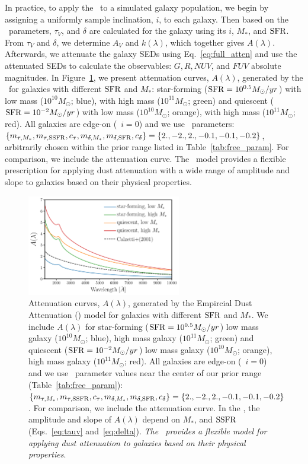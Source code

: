 In practice, to apply the \eda~to a simulated galaxy population, we begin by
assigning a uniformly sample inclination, $i$, to each galaxy. Then based on
the \eda~parameters, $\tau_V$, and $\delta$ are calculated for the galaxy using
its $i$, $M_*$, and ${\rm SFR}$. From $\tau_V$ and $\delta$, we determine $A_V$ and
$k(\lambda)$, which together gives $A(\lambda)$.  Afterwards, we attenuate the
galaxy SEDs using Eq.~\ref{eq:full_atten} and use the attenuated SEDs to
calculate the observables: $G, R, NUV$, and $FUV$
absolute magnitudes. In Figure~\ref{fig:dem_av}, we present attenuation curves,
$A(\lambda)$, generated by the \eda~for galaxies with different ${\rm SFR}$ and $M_*$: 
star-forming (${\rm SFR}=10^{0.5}M_\odot/yr$) with low mass ($10^{10}M_\odot$;
blue), with high mass ($10^{11}M_\odot$; green) and quiescent
(${\rm SFR}=10^{-2}M_\odot/yr$) with low mass ($10^{10}M_\odot$; orange), with high
mass ($10^{11}M_\odot$; red). All galaxies are edge-on (\ie~$i=0$) and we use
\eda~parameters: $\{m_{\tau,M_*}, m_{\tau,{\rm SSFR}}, c_\tau, m_{\delta,M_*}, m_{\delta,{\rm SFR}}, c_\delta\} =
\{2., -2., 2., -0.1, -0.1, -0.2\}$, arbitrarily chosen within the prior range
listed in Table~\ref{tab:free_param}. For comparison, we include the
\cite{calzetti2001} attenuation curve. The \eda~model provides a flexible
prescription for applying dust attenuation with a wide range of amplitude and
slope to galaxies based on their physical properties. 

\begin{figure}
\begin{center}
    \includegraphics[width=0.6\textwidth]{figs/dems.pdf}
    \caption{\label{fig:dem_av}
    Attenuation curves, $A(\lambda)$, generated by the Empircial Dust Attenuation (\eda)
    model for galaxies with different ${\rm SFR}$ and $M_*$. We include $A(\lambda)$ for 
    star-forming (${\rm SFR}=10^{0.5}M_\odot/yr$) low mass galaxy ($10^{10}M_\odot$;
    blue), high mass galaxy ($10^{11}M_\odot$; green) and quiescent
    (${\rm SFR}=10^{-2}M_\odot/yr$) low mass galaxy ($10^{10}M_\odot$; orange), 
    high mass galaxy ($10^{11}M_\odot$; red). All galaxies are edge-on
    (\ie~$i=0$) and we use \eda~parameter values near the center of our prior
    range (Table~\ref{tab:free_param}):$\{m_{\tau,M_*}, m_{\tau,{\rm SSFR}}, c_\tau, m_{\delta,M_*},
    m_{\delta,{\rm SFR}}, c_\delta\} = \{2., -2., 2., -0.1, -0.1, -0.2\}$. For comparison, 
    we include the \cite{calzetti2001} attenuation curve. In the \eda, the
    amplitude and slope of $A(\lambda)$ depend on $M_*$, and ${\rm SSFR}$ (Eqs.~\ref{eq:tauv}
    and~\ref{eq:delta}). {\em The \eda~provides a flexible model for
    applying dust attenuation to galaxies based on their physical properties}.
    } 
\end{center}
\end{figure}


